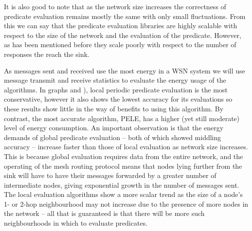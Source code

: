 It is also good to note that as the network size increases the correctness of predicate evaluation remains mostly the same with only small fluctuations. From this we can say that the predicate evaluation libraries are highly scalable with respect to the size of the network and the evaluation of the predicate. However, as has been mentioned before they scale poorly with respect to the number of responses the reach the sink.

As messages sent and received use the most energy in a WSN system \cite{?} we will use message transmit and receive statistics to evaluate the energy usage of the algorithms. In graphs  and  ), local periodic predicate evaluation is the most conservative, however it also shows the lowest accuracy for its evaluations so these results show little in the way of benefits to using this algorithm. By contrast, the most accurate algorithm, PELE, has a higher (yet still moderate) level of energy consumption. An important observation is that the energy demands of global predicate evaluation -- both of which showed middling accuracy -- increase faster than those of local evaluation as network size increases. This is because global evaluation requires data from the entire network, and the operating of the mesh routing protocol means that nodes lying further from the sink will have to have their messages forwarded by a greater number of intermediate nodes, giving exponential growth in the number of messages sent. The local evaluation algorithms show a more scalar trend as the size of a node's 1- or 2-hop neighbourhood may not increase due to the presence of more nodes in the network -- all that is guaranteed is that there will be more such neighbourhoods in which to evaluate predicates.

